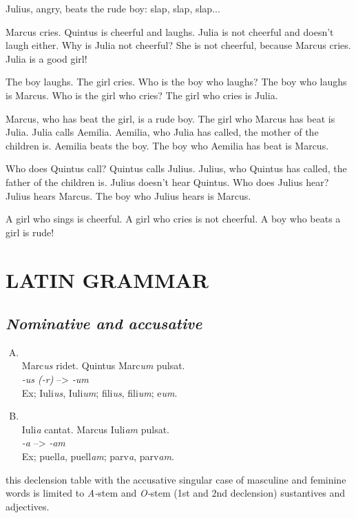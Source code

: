 Julius, angry, beats the rude boy: slap, slap, slap...

Marcus cries. Quintus is cheerful and laughs. Julia is not cheerful and doesn't laugh either. Why is Julia not cheerful? She is not cheerful, because Marcus cries. Julia is a good girl!

The boy laughs. The girl cries. Who is the boy who laughs? The boy who laughs is Marcus. Who is the girl who cries? The girl who cries is Julia.

Marcus, who has beat the girl, is a rude boy. The girl who Marcus has beat is Julia. Julia calls Aemilia. Aemilia, who Julia has called, the mother of the children is. Aemilia beats the boy. The boy who Aemilia has beat is Marcus.

Who does Quintus call? Quintus calls Julius. Julius, who Quintus has called, the father of the children is. Julius doesn't hear Quintus. Who does Julius hear? Julius hears Marcus. The boy who Julius hears is Marcus.

A girl who sings is cheerful. A girl who cries is not cheerful. A boy who beats a girl is rude!

\section[Grammar]{LATIN GRAMMAR}
\subsection{\emph{Nominative and accusative}}

\begin{enumerate}[(A)]
\item {}\\
  Marc\emph{us} ridet. Quintus Marc\emph{um} pulsat.\\
  \emph{-us (-r)} --> \emph{-um}\\
  Ex; Iuli\emph{us}, Iuli\emph{um}; fili\emph{us}, fili\emph{um}; e\emph{um}.
\item {}\\
  Iuli\emph{a} cantat. Marcus Iuli\emph{am} pulsat.\\
  \emph{-a} --> \emph{-am}\\
  Ex; puell\emph{a}, puell\emph{am}; parv\emph{a}, parv\emph{am}.
\end{enumerate}

 this declension table with the accusative singular case of masculine and feminine words is limited to \emph{A-}stem and \emph{O-}stem (1st and 2nd declension) sustantives and adjectives.


